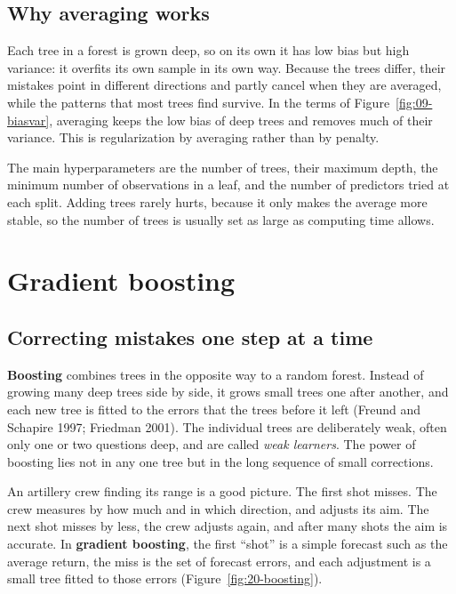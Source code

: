 \subsection{Why averaging works}

Each tree in a forest is grown deep, so on its own it has low bias but high variance: it overfits its own sample in its own way. Because the trees differ, their mistakes point in different directions and partly cancel when they are averaged, while the patterns that most trees find survive. In the terms of Figure~\ref{fig:09-biasvar}, averaging keeps the low bias of deep trees and removes much of their variance. This is regularization by averaging rather than by penalty.

The main hyperparameters are the number of trees, their maximum depth, the minimum number of observations in a leaf, and the number of predictors tried at each split. Adding trees rarely hurts, because it only makes the average more stable, so the number of trees is usually set as large as computing time allows.

\section{Gradient boosting}
\label{sec:20-gbm}

\subsection{Correcting mistakes one step at a time}

\textbf{Boosting} combines trees in the opposite way to a random forest. Instead of growing many deep trees side by side, it grows small trees one after another, and each new tree is fitted to the errors that the trees before it left (Freund and Schapire 1997; Friedman 2001). The individual trees are deliberately weak, often only one or two questions deep, and are called \emph{weak learners}. The power of boosting lies not in any one tree but in the long sequence of small corrections.

An artillery crew finding its range is a good picture. The first shot misses. The crew measures by how much and in which direction, and adjusts its aim. The next shot misses by less, the crew adjusts again, and after many shots the aim is accurate. In \textbf{gradient boosting}, the first ``shot'' is a simple forecast such as the average return, the miss is the set of forecast errors, and each adjustment is a small tree fitted to those errors (Figure~\ref{fig:20-boosting}).


